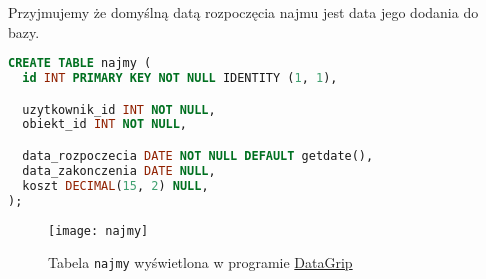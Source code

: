 Przyjmujemy że domyślną datą rozpoczęcia najmu jest data jego dodania do bazy.

\begin{lstlisting}[language=SQL, caption={Skrypt tworzący tabelę \texttt{obiekty}}, label={lst:table-najmy}]
CREATE TABLE najmy (
  id INT PRIMARY KEY NOT NULL IDENTITY (1, 1),

  uzytkownik_id INT NOT NULL,
  obiekt_id INT NOT NULL,

  data_rozpoczecia DATE NOT NULL DEFAULT getdate(),
  data_zakonczenia DATE NULL,
  koszt DECIMAL(15, 2) NULL,
);
\end{lstlisting}

\begin{figure}[h]
	\centering
    \texttt{[image: najmy]}
	\caption{Tabela \texttt{najmy} wyświetlona w programie \href{https://www.jetbrains.com/datagrip/}{DataGrip}}
	\label{fig:najmy}
\end{figure}